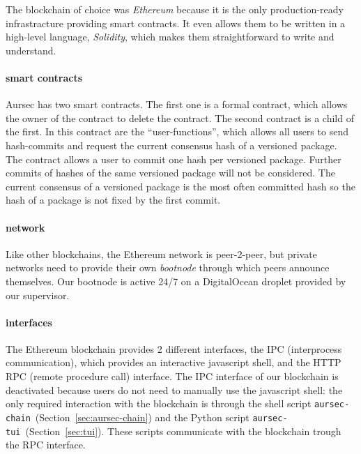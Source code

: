 The blockchain of choice was \emph{Ethereum} because it is the only production-ready infrastracture providing smart contracts. It even allows them to be written in a high-level language, \emph{Solidity}, which makes them straightforward to write and understand.

\paragraph*{smart contracts}
Aursec has two smart contracts. The first one is a formal contract, which allows the owner of the contract to delete the contract. The second contract is a child of the first. In this contract are the ``user-functions'', which allows all users to send hash-commits and request the current consensus hash of a versioned package. The contract allows a user to commit one hash per versioned package. Further commits of hashes of the same versioned package will not be considered. The current consensus of a versioned package is the most often committed hash so the hash of a package is not fixed by the first commit.

\paragraph*{network}
Like other blockchains, the Ethereum network is peer-2-peer, but private networks need to provide their own \emph{bootnode} through which peers announce themselves. Our bootnode is active 24/7 on a DigitalOcean droplet provided by our supervisor.

\paragraph*{interfaces}
The Ethereum blockchain provides 2 different interfaces, the IPC (interprocess communication), which provides an interactive javascript shell, and the HTTP RPC (remote procedure call) interface. The IPC interface of our blockchain is deactivated because users do not need to manually use the javascript shell: the only required interaction with the blockchain is through the shell script \texttt{aursec-chain}~(Section~\ref{sec:aursec-chain}) and the Python script \texttt{aursec-tui}~(Section~\ref{sec:tui}). These scripts communicate with the blockchain trough the RPC interface.
